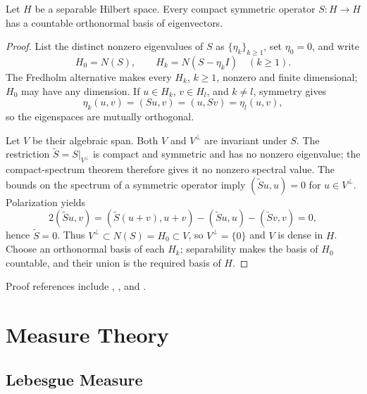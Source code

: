 
\begin{theorem}
\label{thm:eigenvectors-compact-symmetric-operator}

Let $H$ be a separable Hilbert space. Every compact symmetric operator
$S:H\to H$ has a countable orthonormal basis of eigenvectors.
\end{theorem}
\begin{proof}
\sketch List the distinct nonzero eigenvalues of $S$ as $\{\eta_k\}_{k\geq1}$,
set $\eta_0=0$, and write
\[
H_0=N(S),\qquad H_k=N(S-\eta_kI)\quad(k\geq1).
\]
The Fredholm alternative makes every $H_k$, $k\geq1$, nonzero and finite
dimensional; $H_0$ may have any dimension. If $u\in H_k$, $v\in H_l$, and
$k\ne l$, symmetry gives
\[
\eta_k(u,v)=(Su,v)=(u,Sv)=\eta_l(u,v),
\]
so the eigenspaces are mutually orthogonal.

Let $V$ be their algebraic span. Both $V$ and $V^\perp$ are invariant under
$S$. The restriction $\widetilde S=S|_{V^\perp}$ is compact and symmetric and
has no nonzero eigenvalue; the compact-spectrum theorem therefore gives it no
nonzero spectral value. The bounds on the spectrum of a symmetric operator
imply $(\widetilde Su,u)=0$ for $u\in V^\perp$. Polarization yields
\[
2(\widetilde Su,v)
=(\widetilde S(u+v),u+v)-(\widetilde Su,u)-(\widetilde Sv,v)=0,
\]
hence $\widetilde S=0$. Thus $V^\perp\subset N(S)=H_0\subset V$, so
$V^\perp=\{0\}$ and $V$ is dense in $H$. Choose an orthonormal basis of each
$H_k$; separability makes the basis of $H_0$ countable, and their union is the
required basis of $H$.
\end{proof}

Proof references include \cite{Brezis1983}, \cite[Chapter 5]{GilbargTrudinger1983},
and \cite{Yosida1980}.

\section{Measure Theory}
\label{sec:measure-theory}

\subsection{Lebesgue Measure}
\label{sec:lebesgue-measure}

